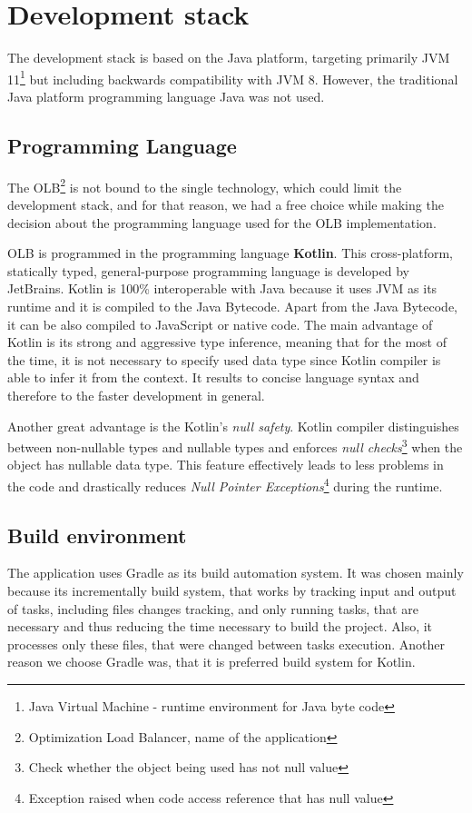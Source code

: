 \section{Development stack}\label{sec:development-stack}
The development stack is based on the Java platform, 
targeting primarily JVM 11\footnote{Java Virtual Machine - runtime environment for Java byte code}
but including backwards compatibility with JVM 8.
However, 
the traditional Java platform programming language Java was not used.

\subsection{Programming Language}\label{subsec:programming-language}
The OLB\footnote{Optimization Load Balancer, name of the application} is not bound to the single technology, 
which could limit the development stack, and for that reason,
we had a free choice while making the decision about the programming language used for the OLB implementation.

OLB is programmed in the programming language \textbf{Kotlin}.
This cross-platform, statically typed, general-purpose programming language is developed by JetBrains\cite{kotlinReference}.
Kotlin is 100\% interoperable with Java because it uses JVM as its runtime and it is compiled to the Java Bytecode.
Apart from the Java Bytecode, it can be also compiled to JavaScript or native code.\cite{kotlinReference}
The main advantage of Kotlin is its strong and aggressive type inference,
meaning that for the most of the time,
it is not necessary to specify used data type since Kotlin compiler is able to infer it from the context.\cite{kotlinReference}
It results to concise language syntax and therefore to the faster development in general.

Another great advantage is the Kotlin's \textit{null safety}. 
Kotlin compiler distinguishes between non-nullable types and nullable types 
and enforces \textit{null checks}\footnote{Check whether the object being used has not null value} when the object has nullable data type.
This feature effectively leads to less problems in the code
and drastically reduces \textit{Null Pointer Exceptions}\footnote{Exception raised when code access reference that has null value}
during the runtime.

\subsection{Build environment}
The application uses Gradle as its build automation system.
It was chosen mainly because its incrementally build system,
that works by tracking input and output of tasks, 
including files changes tracking, and only running tasks, that are necessary
and thus reducing the time necessary to build the project. 
Also, it processes only these files, that were changed between tasks execution. 
Another reason we choose Gradle was, that it is preferred build system for Kotlin.

